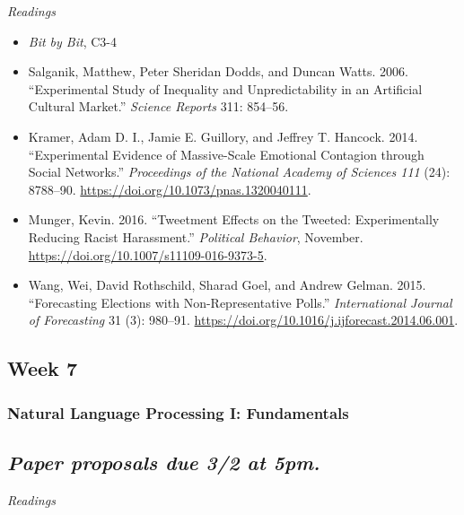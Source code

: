 \documentclass[
  10pt,
]{article}
\providecommand{\tightlist}{%
  \setlength{\itemsep}{0pt}\setlength{\parskip}{0pt}}
\begin{document}
\emph{Readings}

\begin{itemize}
\tightlist
\item
  \emph{Bit by Bit}, C3-4
\item
  Salganik, Matthew, Peter Sheridan Dodds, and Duncan Watts. 2006.
  ``Experimental Study of Inequality and Unpredictability in an
  Artificial Cultural Market.'' \emph{Science Reports} 311: 854--56.
\item
  Kramer, Adam D. I., Jamie E. Guillory, and Jeffrey T. Hancock. 2014.
  ``Experimental Evidence of Massive-Scale Emotional Contagion through
  Social Networks.'' \emph{Proceedings of the National Academy of
  Sciences 111} (24): 8788--90.
  \url{https://doi.org/10.1073/pnas.1320040111}.
\item
  Munger, Kevin. 2016. ``Tweetment Effects on the Tweeted:
  Experimentally Reducing Racist Harassment.'' \emph{Political
  Behavior}, November. \url{https://doi.org/10.1007/s11109-016-9373-5}.
\item
  Wang, Wei, David Rothschild, Sharad Goel, and Andrew Gelman. 2015.
  ``Forecasting Elections with Non-Representative Polls.''
  \emph{International Journal of Forecasting} 31 (3): 980--91.
  \url{https://doi.org/10.1016/j.ijforecast.2014.06.001}.
\end{itemize}

\hypertarget{week-7}{%
\subsection{Week 7}\label{week-7}}

\hypertarget{natural-language-processing-i-fundamentals}{%
\subsubsection{Natural Language Processing I:
Fundamentals}\label{natural-language-processing-i-fundamentals}}

\hypertarget{paper-proposals-due-32-at-5pm.}{%
\subsection{\texorpdfstring{\emph{Paper proposals due 3/2 at
5pm.}}{Paper proposals due 3/2 at 5pm.}}\label{paper-proposals-due-32-at-5pm.}}

\emph{Readings}
\end{document}
